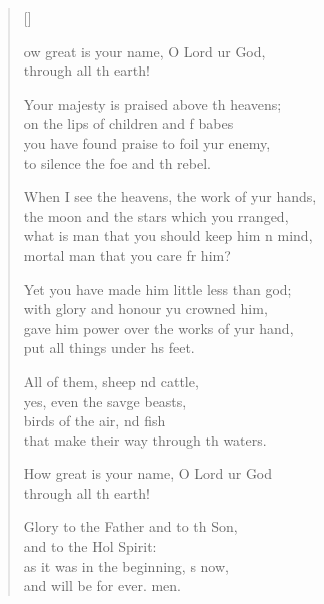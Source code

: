 \settowidth{\versewidth}{When I see the heavens, the work of your hands, *}
\begin{verse}[\versewidth]
  \begin{patverse}

ow great is your name, O Lord ur God,\Med\\
through all th earth!

Your majesty is praised above th heavens;\Med\\
on the lips of children and f babes\\
you have found praise to foil yur enemy,\Med\\
to silence the foe and th rebel.

When I see the heavens, the work of yur hands,\Med\\
the moon and the stars which you rranged,\\
what is man that you should keep him \pointup{\i}n mind,\Med\\
mortal man that you care fr him?

Yet you have made him little less than  god;\Med\\
with glory and honour yu crowned him,\\
gave him power over the works of yur hand,\Med\\
put all things under h\pointup{\i}s feet.

All of them, sheep nd cattle,\Med\\
yes, even the savge beasts,\\
birds of the air, nd fish\Med\\
that make their way through th waters.

How great is your name, O Lord ur God\Med\\
through all th earth!

Glory to the Father and to th Son,\Med\\
and to the Hol Spirit:\\
as it was in the beginning, \pointup{\i}s now,\Med\\
and will be for ever. men.
  \end{patverse}
  \end{verse}
